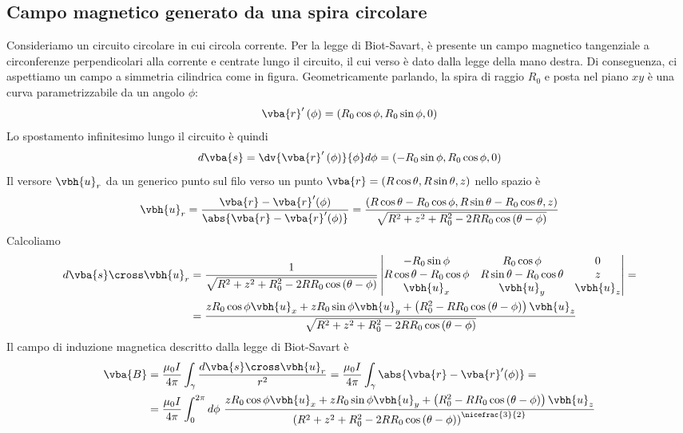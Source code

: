 \subsection{Campo magnetico generato da una spira circolare}
Consideriamo un circuito circolare in cui circola corrente. Per la legge di Biot-Savart, è presente un campo magnetico tangenziale a circonferenze perpendicolari alla corrente e centrate lungo il circuito, il cui verso è dato dalla legge della mano destra. Di conseguenza, ci aspettiamo un campo a simmetria cilindrica come in figura.
Geometricamente parlando, la spira di raggio $R_0$ e posta nel piano $xy$ è una curva parametrizzabile da un angolo $\phi$:
\begin{equation*}
	\vba{r}'\left(\phi\right)=\left(R_0\cos\phi,R_0\sin\phi,0\right)
\end{equation*}
Lo spostamento infinitesimo lungo il circuito è quindi
\begin{equation*}
	d\vba{s}=\dv{\vba{r}'\left(\phi\right)}{\phi}d\phi=\left(-R_0\sin\phi,R_0\cos\phi,0\right)
\end{equation*}
Il versore $\vbh{u}_r$ da un generico punto sul filo verso un punto $\vba{r}=\left(R\cos\theta,R\sin\theta,z\right)$ nello spazio è
\begin{equation*}
	\vbh{u}_r=\frac{\vba{r}-\vba{r}'(\phi)}{\abs{\vba{r}-\vba{r}'(\phi)}}=\frac{\left(R\cos\theta-R_0\cos\phi,R\sin\theta-R_0\cos\theta,z\right)}{\sqrt{R^2+z^2+R_0^2-2RR_0\cos\left(\theta-\phi\right)}}
\end{equation*}
Calcoliamo
\begin{align*}
	d\vba{s}\cross\vbh{u}_r&=\frac{1}{\sqrt{R^2+z^2+R_0^2-2RR_0\cos\left(\theta-\phi\right)}}
	\begin{vmatrix}
		-R_0\sin\phi & R_0\cos\phi & 0\\
		R\cos\theta-R_0\cos\phi & R\sin\theta-R_0\cos\theta & z\\
		\vbh{u}_x & \vbh{u}_y & \vbh{u}_z 
	\end{vmatrix}
	=\\
	&=\frac{zR_0\cos\phi\vbh{u}_x+zR_0\sin\phi\vbh{u}_y+\left(R_0^2-RR_0\cos\left(\theta-\phi\right)\right)\vbh{u}_z}{\sqrt{R^2+z^2+R_0^2-2RR_0\cos\left(\theta-\phi\right)}}
\end{align*}
Il campo di induzione magnetica descritto dalla legge di Biot-Savart è
\begin{align*}
	\vba{B}&=\frac{\mu_0 I}{4\pi }\int_{\gamma}\frac{d\vba{s}\cross\vbh{u}_r}{r^2}=\frac{\mu_0 I}{4\pi}\int_{\gamma}{\abs{\vba{r}-\vba{r}'(\phi)}}=\\
	&=\frac{\mu_0 I}{4\pi }\int_0^{2\pi}d\phi\ \frac{zR_0\cos\phi\vbh{u}_x+zR_0\sin\phi\vbh{u}_y+\left(R_0^2-RR_0\cos\left(\theta-\phi\right)\right)\vbh{u}_z}{\left(R^2+z^2+R_0^2-2RR_0\cos\left(\theta-\phi\right)\right)^{\nicefrac{3}{2}}}
\end{align*}
